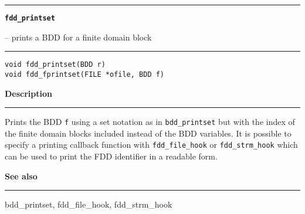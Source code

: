 \begin{minipage}{\textwidth}

\noindent\begin{minipage}{\textwidth}
\rule{\textwidth}{0.5mm}
{\tt\bf fdd\_printset }
\--- prints a BDD for a finite domain block  \hspace{\fill}
\\\rule[1.5ex]{\textwidth}{0.5mm}
\end{minipage}

\noindent\begin{verbatim}
void fdd_printset(BDD r)
void fdd_fprintset(FILE *ofile, BDD f) 
\end{verbatim}

\vspace{\parsep}\noindent
{\bf Description}\\\rule[1.5ex]{\textwidth}{0.2mm}\vspace{-1.5ex}\setlength{\parindent}{1em}
Prints the BDD {\tt f} using a set notation as in
           {\tt bdd\_printset} but with the index of the finite domain blocks
	   included instead of the BDD variables. It is possible to specify
	   a printing callback function with {\tt fdd\_file\_hook} or
	   {\tt fdd\_strm\_hook} which can be used to print the FDD
	   identifier in a readable form. 

\vspace{\parsep}\vspace{\baselineskip}\noindent
{\bf See also}\\\rule[1.5ex]{\textwidth}{0.2mm}\vspace{-1.5ex}
bdd\_printset, fdd\_file\_hook, fdd\_strm\_hook 
\end{minipage}
\vspace{8ex}
